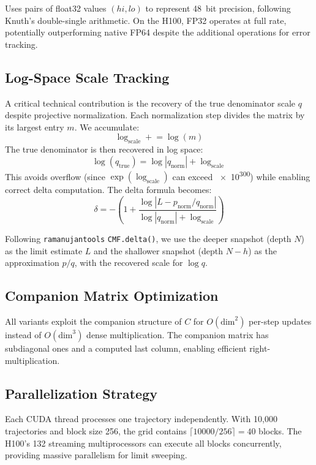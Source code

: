 \documentclass[11pt,a4paper]{article}
\begin{document}
Uses pairs of float32 values $(hi, lo)$ to represent \SI{48}{bit} precision,
following Knuth's double-single arithmetic. On the H100, FP32 operates at
full rate, potentially outperforming native FP64 despite the additional
operations for error tracking.

\subsection{Log-Space Scale Tracking}

A critical technical contribution is the recovery of the true denominator
scale $q$ despite projective normalization. Each normalization step divides
the matrix by its largest entry $m$. We accumulate:
\[
\log_{\text{scale}} \mathrel{+}= \log(m)
\]
The true denominator is then recovered in log space:
\[
\log(q_{\text{true}}) = \log|q_{\text{norm}}| + \log_{\text{scale}}
\]
This avoids overflow (since $\exp(\log_{\text{scale}})$ can exceed
\SI{e300}{}) while enabling correct delta computation. The delta formula
becomes:
\[
\delta = -\left(1 + \frac{\log|L - p_{\text{norm}}/q_{\text{norm}}|}
                        {\log|q_{\text{norm}}| + \log_{\text{scale}}}\right)
\]

Following \texttt{ramanujantools} \texttt{CMF.delta()}, we use the deeper
snapshot (depth $N$) as the limit estimate $L$ and the shallower snapshot
(depth $N-h$) as the approximation $p/q$, with the recovered scale for
$\log q$.

\subsection{Companion Matrix Optimization}

All variants exploit the companion structure of $C$ for $O(\text{dim}^2)$
per-step updates instead of $O(\text{dim}^3)$ dense multiplication. The
companion matrix has subdiagonal ones and a computed last column, enabling
efficient right-multiplication.

\subsection{Parallelization Strategy}

Each CUDA thread processes one trajectory independently. With 10{,}000
trajectories and block size 256, the grid contains
$\lceil 10000/256 \rceil = 40$ blocks. The H100's 132 streaming
multiprocessors can execute all blocks concurrently, providing massive
parallelism for limit sweeping.
\end{document}
